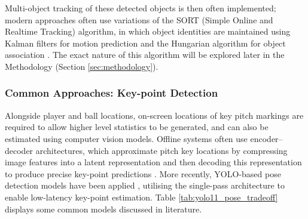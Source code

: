 Multi-object tracking of these detected objects is then often implemented; modern approaches often use variations of the SORT (Simple Online and Realtime Tracking) algorithm, in which object identities are maintained using Kalman filters for motion prediction and the Hungarian algorithm for object association \cite{7533003}. The exact nature of this algorithm will be explored later in the Methodology (Section \ref{sec:methodology}). 

\subsubsection{Common Approaches: Key-point Detection}
\label{subsubsec:keypoint}
Alongside player and ball locations, on-screen locations of key pitch markings are required to allow higher level statistics to be generated, and can also be estimated using computer vision models. Offline systems often use encoder–decoder architectures, which approximate pitch key locations by compressing image features into a latent representation and then decoding this representation to produce precise key-point predictions \cite{Chu_2022_CVPR}. More recently, YOLO-based pose detection models have been applied \cite{Maji_2022_CVPR}, utilising the single-pass architecture to enable low-latency key-point estimation. Table \ref{tab:yolo11_pose_tradeoff} displays some common models discussed in literature.

